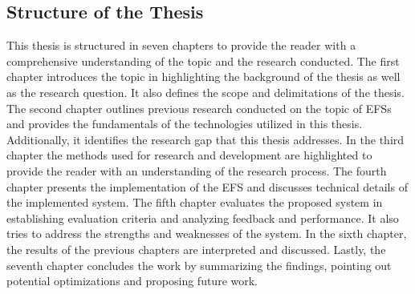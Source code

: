 \subsection{Structure of the Thesis}
This thesis is structured in seven chapters to provide the reader with a comprehensive understanding of the topic and the research conducted. The first chapter introduces the topic in highlighting the background of the thesis as well as the research question. It also defines the scope and delimitations of the thesis. The second chapter outlines previous research conducted on the topic of \acp{EFS} and provides the fundamentals of the technologies utilized in this thesis. Additionally, it identifies the research gap that this thesis addresses. In the third chapter the methods used for research and development are highlighted to provide the reader with an understanding of the research process. The fourth chapter presents the implementation of the \ac{EFS} and discusses technical details of the implemented system. The fifth chapter evaluates the proposed system in establishing evaluation criteria and analyzing feedback and performance. It also tries to address the strengths and weaknesses of the system. In the sixth chapter, the results of the previous chapters are interpreted and discussed. Lastly, the seventh chapter concludes the work by summarizing the findings, pointing out potential optimizations and proposing future work.


